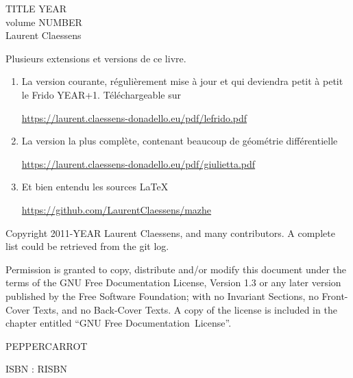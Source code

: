 \documentclass[a4paper,twoside,11pt]{book}
\begin{document}
\pagestyle{empty}

\phantom{Foo}
\newpage

\phantom{Foo}
\newpage

\begin{center}
	TITLE YEAR \\
	volume NUMBER \\
	Laurent Claessens
\end{center}

\newpage

Plusieurs extensions et versions de ce livre.
\begin{enumerate}
	\item
	      La version courante, régulièrement mise à jour et qui deviendra petit à petit le Frido YEAR+1. Téléchargeable sur
	      \begin{center}
		      \url{https://laurent.claessens-donadello.eu/pdf/lefrido.pdf}
	      \end{center}
	\item
	      La version la plus complète, contenant beaucoup de géométrie différentielle
	      \begin{center}
		      \url{https://laurent.claessens-donadello.eu/pdf/giulietta.pdf}
	      \end{center}
	\item
	      Et bien entendu les sources \LaTeX\
	      \begin{center}
		      \url{https://github.com/LaurentClaessens/mazhe}
	      \end{center}
\end{enumerate}

\newpage

\phantom{un foobar bleuté}

\vfill

\begin{center}
	Copyright 2011-YEAR  Laurent Claessens, and many contributors. A complete list could be retrieved from the git log.

	Permission is granted to copy, distribute and/or modify this document under the terms of the GNU Free Documentation License, Version 1.3 or any later version published by the Free Software Foundation; with no Invariant Sections, no Front-Cover Texts, and no Back-Cover Texts. A copy of the license is included in the chapter entitled ``GNU Free Documentation~License''.
\end{center}

\begin{center}
	PEPPERCARROT
\end{center}

\begin{center}
	ISBN : RISBN
\end{center}
\end{document}
